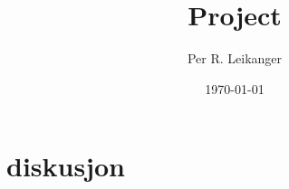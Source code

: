 \documentclass[a4paper,11 pt]{report}
\author{Per R. Leikanger}
\title{Project}
\date{\today}
\begin{document}
   

\maketitle

\tableofcontents

\newpage



\newpage




\newpage








\section{diskusjon}


%

\end{document}
